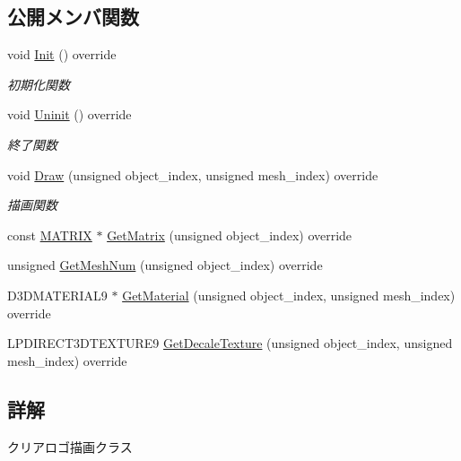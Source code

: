 \subsection*{公開メンバ関数}
\begin{DoxyCompactItemize}
\item 
void \mbox{\hyperlink{class_clear_logo_draw_a9af656c0a8ebfb5fa133a0983add6ffd}{Init}} () override
\begin{DoxyCompactList}\small\item\em 初期化関数 \end{DoxyCompactList}\item 
void \mbox{\hyperlink{class_clear_logo_draw_aa73db5b701e644f8e552ddb254a0a9aa}{Uninit}} () override
\begin{DoxyCompactList}\small\item\em 終了関数 \end{DoxyCompactList}\item 
void \mbox{\hyperlink{class_clear_logo_draw_ab018f370071f370ae7016d8ee402c456}{Draw}} (unsigned object\+\_\+index, unsigned mesh\+\_\+index) override
\begin{DoxyCompactList}\small\item\em 描画関数 \end{DoxyCompactList}\item 
const \mbox{\hyperlink{_vector3_d_8h_a032295cd9fb1b711757c90667278e744}{M\+A\+T\+R\+IX}} $\ast$ \mbox{\hyperlink{class_clear_logo_draw_af5d12b717020101e5c956cf3574f0e2a}{Get\+Matrix}} (unsigned object\+\_\+index) override
\item 
unsigned \mbox{\hyperlink{class_clear_logo_draw_a99aba47b4693f15498daf7df2bfee2d7}{Get\+Mesh\+Num}} (unsigned object\+\_\+index) override
\item 
D3\+D\+M\+A\+T\+E\+R\+I\+A\+L9 $\ast$ \mbox{\hyperlink{class_clear_logo_draw_ab356bf5d56c10a6689e101b35c30d889}{Get\+Material}} (unsigned object\+\_\+index, unsigned mesh\+\_\+index) override
\item 
L\+P\+D\+I\+R\+E\+C\+T3\+D\+T\+E\+X\+T\+U\+R\+E9 \mbox{\hyperlink{class_clear_logo_draw_a04ae25ae9cb59df0d0c346b65baed3f2}{Get\+Decale\+Texture}} (unsigned object\+\_\+index, unsigned mesh\+\_\+index) override
\end{DoxyCompactItemize}


\subsection{詳解}
クリアロゴ描画クラス 

